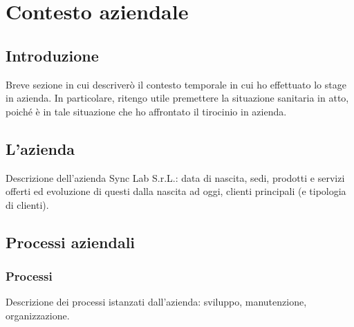 
\chapter{Contesto aziendale}
\label{cap:contesto-aziendale}

%
%
%

\section{Introduzione}

Breve sezione in cui descriverò il contesto temporale in cui ho effettuato lo stage in azienda. In particolare, ritengo utile premettere la situazione sanitaria in atto, poiché è in tale situazione che ho affrontato il tirocinio in azienda.

\section{L'azienda}

Descrizione dell'azienda Sync Lab S.r.L.: data di nascita, sedi, prodotti e servizi offerti ed evoluzione di questi dalla nascita ad oggi, clienti principali (e tipologia di clienti).

\section{Processi aziendali}

\subsection{Processi}
Descrizione dei processi istanzati dall'azienda: sviluppo, manutenzione, organizzazione.

